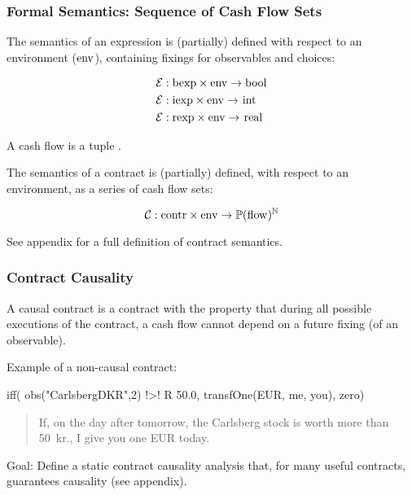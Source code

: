 \documentclass[xcolor=dvipsnames,11pt]{beamer}
\renewcommand{\emph}[1]{\textcolor{structure!90}{#1}}
\newcommand{\ttt}[1]{\mbox{\cd{#1}}}
\begin{document}
\begin{frame}
    \frametitle{Formal Semantics: Sequence of Cash Flow Sets}

The \emph{semantics of an expression} is (partially) defined with
respect to an environment ($\ttt{env}$), containing fixings for
observables and choices:
\vspace*{-2ex}

{\footnotesize
\begin{align*}
  \mathcal{E} & : \ttt{bexp} \times \ttt{env} \rightarrow \ttt{bool}\\
    \mathcal{E} & : \ttt{iexp} \times \ttt{env} \rightarrow \ttt{int}\\
  \mathcal{E} & : \ttt{rexp} \times \ttt{env} \rightarrow \ttt{real}
\end{align*}}
\vspace*{-2ex}

A \emph{cash flow} is a tuple .

\vfill 
The \emph{semantics of a contract} is (partially) defined, with respect
to an environment, as a series of cash flow sets:

$$ \mathcal{C} : \ttt{contr} \times \ttt{env} 
          \rightarrow \mathbb{P}(\ttt{flow})^\mathbb{N}$$

\vfill
See appendix for a full definition of contract semantics.

\end{frame}

\begin{frame}[fragile,t]
    \frametitle{Contract Causality}

 A \emph{causal contract} is a contract with the property that during all
   possible executions of the contract, a cash flow cannot depend on a
   future fixing (of an observable).

\vfill

\emph{Example of a non-causal contract:}

\begin{hscode}
iff( obs("CarlsbergDKR",2) !>! R 50.0,
                              transfOne(EUR, me, you), zero)
\end{hscode}
{\footnotesize
\begin{quote}
  If, \emph{on the day after tomorrow}, 
           the Carlsberg stock is worth more than 50~kr.,
           I give you one EUR \emph{today}.
\end{quote}}

\vfill

\emph{Goal}: Define a static contract causality analysis that, for many useful contracts,
guarantees causality (see appendix).
\end{frame}
\end{document}
